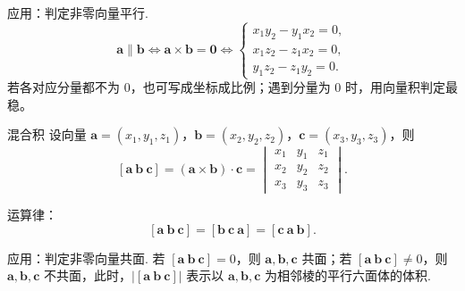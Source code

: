 \begin{zs}
    应用：判定非零向量平行.
\[
\boldsymbol{a} \parallel \boldsymbol{b}
\Leftrightarrow \boldsymbol{a} \times \boldsymbol{b} = \boldsymbol{0}
\Leftrightarrow
\begin{cases}
x_1y_2-y_1x_2=0,\\
x_1z_2-z_1x_2=0,\\
y_1z_2-z_1y_2=0.
\end{cases}
\]
若各对应分量都不为 $0$，也可写成坐标成比例；遇到分量为 $0$ 时，用向量积判定最稳。

\end{zs}

\begin{dl}{ 混合积}{}
设向量 $\boldsymbol{a} = (x_1,y_1,z_1)$，$\boldsymbol{b} = (x_2,y_2,z_2)$，$\boldsymbol{c} = (x_3,y_3,z_3)$，则
\[
[\boldsymbol{a}\ \boldsymbol{b}\ \boldsymbol{c}] = (\boldsymbol{a} \times \boldsymbol{b}) \cdot \boldsymbol{c} =
\begin{vmatrix}
x_1 & y_1 & z_1 \\
x_2 & y_2 & z_2 \\
x_3 & y_3 & z_3
\end{vmatrix}.
\]   
\end{dl}
\begin{zs}
    运算律：
\[
[\boldsymbol{a}\ \boldsymbol{b}\ \boldsymbol{c}] = [\boldsymbol{b}\ \boldsymbol{c}\ \boldsymbol{a}] = [\boldsymbol{c}\ \boldsymbol{a}\ \boldsymbol{b}].
\]
\end{zs}

\begin{zs}
    应用：判定非零向量共面.
若 $[\boldsymbol{a}\ \boldsymbol{b}\ \boldsymbol{c}] = 0$，则 $\boldsymbol{a},\boldsymbol{b},\boldsymbol{c}$ 共面；若 $[\boldsymbol{a}\ \boldsymbol{b}\ \boldsymbol{c}] \neq 0$，则 $\boldsymbol{a},\boldsymbol{b},\boldsymbol{c}$ 不共面，此时，$|[\boldsymbol{a}\ \boldsymbol{b}\ \boldsymbol{c}]|$ 表示以 $\boldsymbol{a},\boldsymbol{b},\boldsymbol{c}$ 为相邻棱的平行六面体的体积.
\end{zs}

